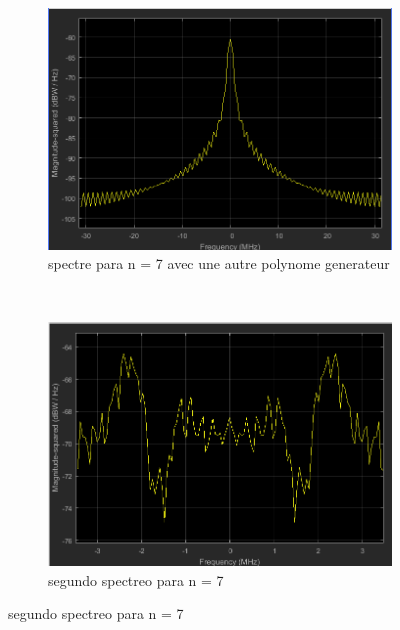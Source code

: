\documentclass{report}
\begin{document}
\begin{figure}
	\centering
	\begin{subfigure}[b]{0.4\textwidth}
	\includegraphics[width=0.9\linewidth]{segundo_espectro_paran77}
\caption{spectre para n = 7 avec une autre polynome generateur}
\label{fig:segundoespectroparan77}
	\end{subfigure}
	~ %
	\begin{subfigure}[b]{0.4\textwidth}
	\includegraphics[width=0.9\linewidth]{segundo_spectro_paran7}
\caption{segundo spectreo para n = 7}
\label{fig:segundospectroparan7}
	\end{subfigure}
\end{figure}


%
%
\end{document}
